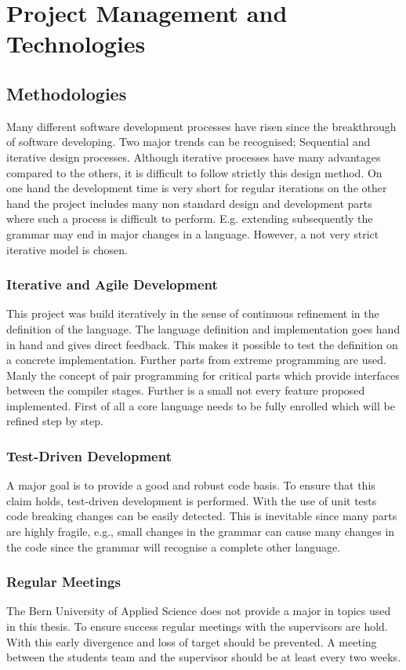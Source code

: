 \part{Project Management and Technologies}
\chapter{Methodologies}
Many different software development processes have risen since the
breakthrough of software developing. Two major trends can be recognised;
Sequential and iterative design processes. Although iterative processes
have many advantages compared to the others, it is difficult to follow
strictly this design method. On one hand the development time is very
short for regular iterations on the other hand the project includes
many non standard design and development parts where such a process is
difficult to perform. E.g. extending subsequently the grammar may end
in major changes in a language. However, a not very strict iterative
model is chosen.

\section{Iterative and Agile Development}
This project was build iteratively in the sense of continuous
refinement in the definition of the language. The language definition and
implementation goes hand in hand and gives direct feedback. This makes it
possible to test the definition on a concrete implementation. Further
parts from extreme programming are used. Manly the concept of pair
programming for critical parts which provide interfaces between the
compiler stages. Further is a small not every feature proposed implemented.
First of all a core language needs to be fully enrolled which will be refined
step by step.

\section{Test-Driven Development}
A major goal is to provide a good and robust code basis. To ensure that
this claim holds, test-driven development is performed. With the use of
unit tests code breaking changes can be easily detected. This is inevitable
since many parts are highly fragile, e.g., small changes in the grammar can
cause many changes in the code since the grammar will recognise a complete
other language.

\section{Regular Meetings}
The Bern University of Applied Science does not provide a major in
topics used in this thesis. To ensure success regular meetings with the
supervisors are hold. With this early divergence and loss of target should
be prevented. A meeting between the students team and the supervisor
should be at least every two weeks.

